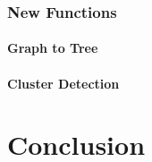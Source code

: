 \documentclass[11pt, a4paper]{report}
\begin{document}
\subsection{New Functions}
\subsubsection{Graph to Tree}
\subsubsection{Cluster Detection}

\chapter{Conclusion}


\appendix
\glsaddall
\printglossaries
\end{document}
